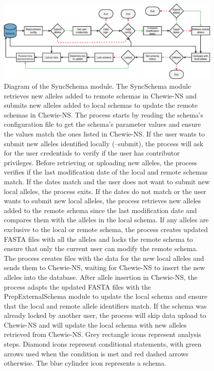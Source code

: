 \newpage
\begin{figure}[h!]
    \centering
    \includegraphics[angle=0,width=\textwidth]{figures/chapter 2/FigureS11.pdf}
    \caption{Diagram of the SyncSchema module. The SyncSchema module retrieves new alleles added to remote schemas in Chewie-NS and submits new alleles added to local schemas to update the remote schemas in Chewie-NS. The process starts by reading the schema’s configuration file to get the schema’s parameter values and ensure the values match the ones listed in Chewie-NS. If the user wants to submit new alleles identified locally (--submit), the process will ask for the user credentials to verify if the user has contributor privileges. Before retrieving or uploading new alleles, the process verifies if the last modification date of the local and remote schemas match. If the dates match and the user does not want to submit new local alleles, the process exits. If the dates do not match or the user wants to submit new local alleles, the process retrieves new alleles added to the remote schema since the last modification date and compares them with the alleles in the local schema. If any alleles are exclusive to the local or remote schema, the process creates updated FASTA files with all the alleles and locks the remote schema to ensure that only the current user can modify the remote schema. The process creates files with the data for the new local alleles and sends them to Chewie-NS, waiting for Chewie-NS to insert the new alleles into the database. After allele insertion in Chewie-NS, the process adapts the updated FASTA files with the PrepExternalSchema module to update the local schema and ensure that the local and remote allele identifiers match. If the schema was already locked by another user, the process will skip data upload to Chewie-NS and will update the local schema with new alleles retrieved from Chewie-NS. Grey rectangle icons represent analysis steps. Diamond icons represent conditional statements, with green arrows used when the condition is met and red dashed arrows otherwise. The blue cylinder icon represents a schema.}
    \label{fig:chap2_figureS11}
\end{figure}

